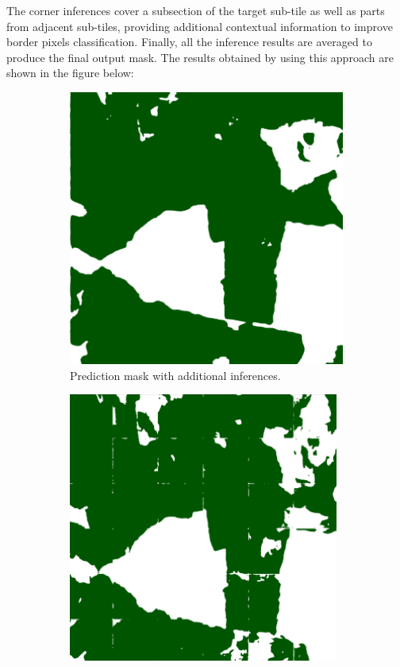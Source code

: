  The corner inferences cover a subsection of the target sub-tile as well as parts from adjacent sub-tiles, providing additional contextual information to improve border pixels classification. Finally, all the inference results are averaged to produce the final output mask. The results obtained by using this approach are shown in the figure below: 
\newpage


\begin{figure}[H]
\centering
\begin{subfigure}{0.49\textwidth}
\centering
\includegraphics[width = \textwidth]{IMAGENES/IMG20-Aver-Mask.png}
\caption{Prediction mask with additional inferences.}
\label{fig:left}
\end{subfigure}
\begin{subfigure}{0.49\textwidth}
\centering
\includegraphics[width = \textwidth]{IMAGENES/IMG18-No-Aver-Mask.png}

\end{subfigure}
\end{figure}

